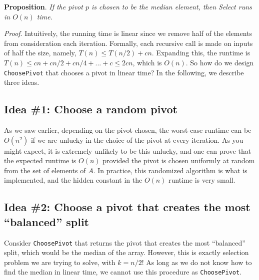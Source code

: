 \documentclass [12pt]{article}
\begin{document}
\textbf{Proposition}. \textit{If the pivot $p$ is chosen to be the median element, then Select runs in $O(n)$ time.}

\textit{Proof}. Intuitively, the running time is linear since we remove half of the elements from consideration each iteration. Formally, each recursive call is made on inputs of half the size, namely, $T(n) \leq T(n/2)+cn$. Expanding this, the runtime is $T(n) \leq cn+cn/2+cn/4+...+c \leq 2cn$, which is $O(n)$. So how do we design \texttt{ChoosePivot} that chooses a pivot in linear time? In the following, we describe three ideas.

\subsection{Idea \#1: Choose a random pivot}

As we saw earlier, depending on the pivot chosen, the worst-case runtime can be $O(n^2)$ if we are unlucky in the choice of the pivot at every iteration. As you might expect, it is extremely unlikely to be this unlucky, and one can prove that the expected runtime is $O(n)$ provided the pivot is chosen uniformly at random from the set of elements of $A$. In practice, this randomized algorithm is what is implemented, and the hidden constant in the $O(n)$ runtime is very small.

\subsection{Idea \#2: Choose a pivot that creates the most ``balanced'' split}

Consider \texttt{ChoosePivot} that returns the pivot that creates the most ``balanced'' split, which would be the median of the array. However, this is exactly selection problem we are trying to solve, with $k = n/2$! As long as we do not know how to find the median in linear time, we cannot use this procedure as \texttt{ChoosePivot}.
\end{document}
